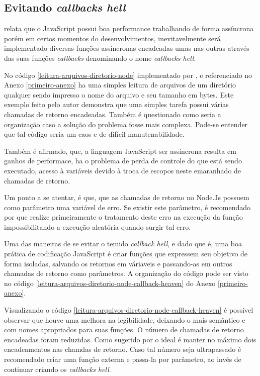 \subsection{Evitando \textit{callbacks hell}}

  \cite{Pereira:2013} relata que o JavaScript possui boa performance trabalhando de forma assíncrona porém em certos 
  momentos do desenvolvimentos, inevitavelmente será implementado diversas funções assíncronas encadeadas umas nas 
  outras através das suas funções \textit{callbacks} denominando o nome \textit{callbacks hell}.
  
  No código \ref{leitura-arquivos-diretorio-node} implementado por , e referenciado no Anexo \ref{primeiro-anexo}
  ha uma simples leitura de arquivos de um diretório qualquer sendo impresso o nome do arquivo e seu tamanho em
  bytes. Este exemplo feito pelo autor demonstra que uma simples tarefa possui várias chamadas de retorno encadeadas. Também
  é questionado como seria a organização caso a solução do problema fosse mais complexa. Pode-se entender que tal código
  seria um caos e de difícil manutenabilidade.
  
  Também é afirmado, que, a linguagem JavaScript ser assíncrona resulta em ganhos de 
  performace, ha o problema de perda de controle do que está sendo executado, acesso à variáveis devido à troca de escopos
  neste emaranhado de chamadas de retorno.
  
  Um ponto a se atentar, é que, que as chamadas de retorno no Node.Js possuem como parâmetro uma variável de erro. Se existir
  este parâmetro, é recomendado por  que realize primeiramente o tratamento deste erro na execução da função
  impossibilitando a execução aleatória quando surgir tal erro.
  
  Uma das maneiras de se evitar o temido \textit{callback hell}, e dado que é, uma boa prática de codificação JavaScript é
  criar funções que expressem seu objetivo de forma isoladas, salvando os retornos em váriaveis e passando-as em outros
  chamadas de retorno como parâmetros. A organização do código pode ser visto no código \ref{leitura-arquivos-diretorio-node-callback-heaven} do
  Anexo \ref{primeiro-anexo}.\cite{Pereira:2013}
  
  Visualizando o código \ref{leitura-arquivos-diretorio-node-callback-heaven} é possível observar que houve uma melhora na 
  legibilidade, deixando-o mais semântico e com nomes apropriados para suas funções. O número de chamadas de retorno encadeadas
  foram reduzidas. Como sugerido por \cite{Pereira:2013} o ideal é manter no máximo dois encadeamentos nas chamdas de retorno.
  Caso tal número seja ultrapassado é recomendado criar uma função externa e passa-la por parâmetro, ao invés de 
  continuar criando os \textit{callbacks hell}.
  
